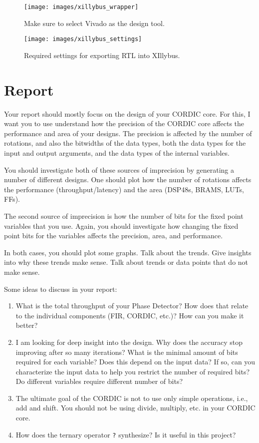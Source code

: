 \begin{figure}[!ht]
\centering
%
\texttt{[image: images/xillybus\_wrapper]}
\caption{Make sure to select Vivado as the design tool.}
\label{fig:xillybus_wrapper}
\end{figure}

\begin{figure}[!h]
\centering
%
\texttt{[image: images/xillybus\_settings]}
\caption{Required settings for exporting RTL into XIllybus.}
\label{fig:xillybus_settings}
\end{figure}

\section{Report}

Your report should mostly focus on the design of your CORDIC core. For this, I want you to use understand how the precision of the CORDIC core affects the performance and area of your designs. The precision is affected by the number of rotations, and also the bitwidths of the data types, both the data types for the input and output arguments, and the data types of the internal variables. 

You should investigate both of these sources of imprecision by generating a number of different designs. One should plot how the number of rotations affects the performance (throughput/latency) and the area (DSP48s, BRAMS, LUTs, FFs). 

The second source of imprecision is how the number of bits for the fixed point variables that you use. Again, you should investigate how changing the fixed point bits for the variables affects the precision, area, and performance. 

In both cases, you should plot some graphs. Talk about the trends. Give insights into why these trends make sense. Talk about trends or data points that do not make sense.

Some ideas to discuss in your report:
\begin{enumerate}
\item What is the total throughput of your Phase Detector? How does that relate to the individual components (FIR, CORDIC, etc.)? How can you make it better?
\item I am looking for deep insight into the design. Why does the accuracy stop improving after so many iterations? What is the minimal amount of bits required for each variable? Does this depend on the input data? If so, can you characterize the input data to help you restrict the number of required bits? Do different variables require different number of bits?
\item The ultimate goal of the CORDIC is not to use only simple operations, i.e., add and shift. You should not be using divide, multiply, etc. in your CORDIC core.
\item How does the ternary operator \texttt{?} synthesize? Is it useful in this project? 
\end{enumerate}

